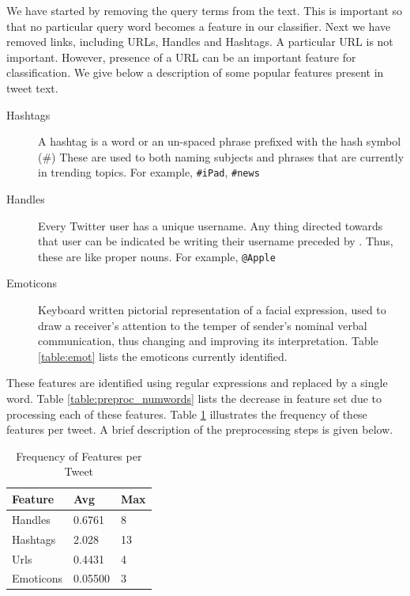 We have started by removing the query terms from the text.
This is important so that no particular query word becomes a feature in our classifier.
Next we have removed links, including URLs, Handles and Hashtags.
A particular URL is not important. However, presence of a URL can be an important feature for classification.
We give below a description of some popular features present in tweet text.

	\begin{description}
	\item[Hashtags]{A hashtag is a word or an un-spaced phrase prefixed with the hash symbol (\#)
					These are used to both naming subjects and phrases that are currently in trending topics.
					For example, \verb+#iPad+, \verb+#news+}
	\item[Handles]{Every Twitter user has a unique username.
					Any thing directed towards that user can be indicated be writing their username preceded by \@.
					Thus, these are like proper nouns.
						For example, \verb+@Apple+}
	\item[Emoticons]{Keyboard written pictorial representation of a facial expression,
						used to draw a receiver's attention to the temper of sender's nominal verbal communication,
						thus changing and improving its interpretation.
					Table \ref{table:emot} lists the emoticons currently identified.} %
	\end{description}

These features are identified using regular expressions and replaced by a single word.
Table \ref{table:preproc_numwords} lists the decrease in feature set due to processing each of these features.
Table \ref{table:preproc_freq} illustrates the frequency of these features per tweet.
A brief description of the preprocessing steps is given below.

\begin{table}[h]
\centering
	\begin{tabular}{|l|l|l|}
	\hline
	Feature    & Avg & Max \\
	\hline
	Handles    & 0.6761 & 8 \\
	Hashtags   & 2.028 & 13 \\
	Urls       & 0.4431 & 4 \\
	Emoticons  & 0.05500 & 3 \\
	\hline
	\end{tabular}
\caption{Frequency of Features per Tweet}
\label{table:preproc_freq}
\end{table}

